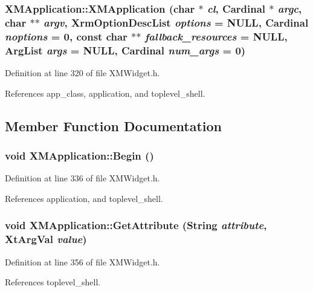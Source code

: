 \subsubsection{\setlength{\rightskip}{0pt plus 5cm}XMApplication::XMApplication (char $\ast$ {\em cl}, Cardinal $\ast$ {\em argc}, char $\ast$$\ast$ {\em argv}, Xrm\-Option\-Desc\-List {\em options} = NULL, Cardinal {\em noptions} = 0, const char $\ast$$\ast$ {\em fallback\_\-resources} = NULL, Arg\-List {\em args} = NULL, Cardinal {\em num\_\-args} = 0)\hspace{0.3cm}{\tt  [inline]}}\label{classXMApplication_a0}




Definition at line 320 of file XMWidget.h.

References app\_\-class, application, and toplevel\_\-shell.

\subsection{Member Function Documentation}
\subsubsection{\setlength{\rightskip}{0pt plus 5cm}void XMApplication::Begin ()\hspace{0.3cm}{\tt  [inline]}}\label{classXMApplication_a1}




Definition at line 336 of file XMWidget.h.

References application, and toplevel\_\-shell.
\subsubsection{\setlength{\rightskip}{0pt plus 5cm}void XMApplication::Get\-Attribute (String {\em attribute}, Xt\-Arg\-Val {\em value})\hspace{0.3cm}{\tt  [inline]}}\label{classXMApplication_a11}




Definition at line 356 of file XMWidget.h.

References toplevel\_\-shell.
